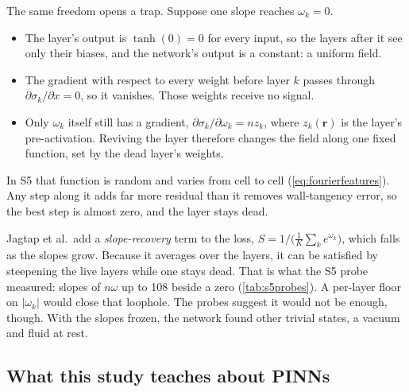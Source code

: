The same freedom opens a trap. Suppose one slope reaches $\omega_k = 0$.
\begin{itemize}
  \item The layer's output is $\tanh(0) = 0$ for every input, so the layers after it see only their
    biases, and the network's output is a constant: a uniform field.
  \item The gradient with respect to every weight before layer $k$ passes through
    $\partial\sigma_k/\partial x = 0$, so it vanishes. Those weights receive no signal.
  \item Only $\omega_k$ itself still has a gradient, $\partial\sigma_k/\partial\omega_k = n z_k$,
    where $z_k(\bm r)$ is the layer's pre-activation. Reviving the layer therefore changes the
    field along one fixed function, set by the dead layer's weights.
\end{itemize}
In S5 that function is random and varies from cell to cell (\cref{eq:fourierfeatures}). Any step
along it adds far more residual than it removes wall-tangency error, so the best step is almost
zero, and the layer stays dead.

Jagtap et al.\ add a \emph{slope-recovery} term to the loss, $S = 1/\bigl(\tfrac1K\sum_k
e^{\omega_k}\bigr)$, which falls as the slopes grow. Because it averages over the layers, it can be
satisfied by steepening the live layers while one stays dead. That is what the S5 probe measured:
slopes of $n\omega$ up to 108 beside a zero (\cref{tab:s5probes}). A per-layer floor on $|\omega_k|$
would close that loophole. The probes suggest it would not be enough, though. With the slopes
frozen, the network found other trivial states, a vacuum and fluid at rest.

\subsection{What this study teaches about PINNs}
\label{app:lessons}

